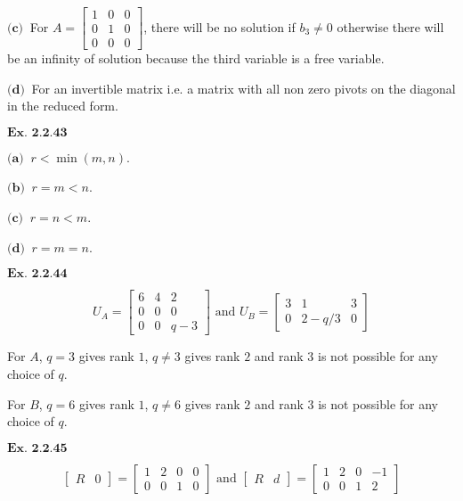 \documentclass{article}
\begin{document}
$\textbf{(c)} \ $ For $A = \begin{bmatrix}1 & 0 & 0\\ 0 & 1 & 0 \\ 0 & 0 & 0\end{bmatrix}$, there will be no solution if $b_3 \neq 0$ otherwise there will be an infinity of solution because the third variable is a free variable.

$\textbf{(d)} \ $ For an invertible matrix i.e. a matrix with all non zero pivots on the diagonal in the reduced form.

\vspace{0.2in}
${\textbf{Ex. 2.2.43}}$

$\textbf{(a)} \ $ $r < \min(m,n)$.

$\textbf{(b)} \ $ $r = m < n$.

$\textbf{(c)} \ $ $r = n < m$.

$\textbf{(d)} \ $ $r = m = n$.

\vspace{0.2in}
${\textbf{Ex. 2.2.44}}$

$$
U_{A} = \begin{bmatrix}6&4&2\\0&0&0\\0&0&q-3\end{bmatrix} \text{ and } U_B = \begin{bmatrix}3&1&3\\0&2-q/3&0\end{bmatrix}
$$

For $A$, $q=3$ gives rank $1$, $q \neq 3$ gives rank $2$ and rank $3$ is not possible for any choice of $q$.

For $B$, $q=6$ gives rank $1$, $q \neq 6$ gives rank $2$ and rank $3$ is not possible for any choice of $q$.

\vspace{0.2in}
${\textbf{Ex. 2.2.45}}$

$$
\begin{bmatrix}R & 0\end{bmatrix} = \begin{bmatrix}1&2&0&0\\0&0&1&0\end{bmatrix} \text{ and } \begin{bmatrix}R & d\end{bmatrix} = \begin{bmatrix}1&2&0&-1\\0&0&1&2\end{bmatrix}
$$
\end{document}
